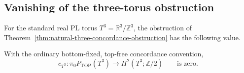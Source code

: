 \subsection{Vanishing of the three-torus obstruction}

For the standard real PL torus $T^3=\mathbb R^3/\mathbb Z^3$,
the obstruction of
Theorem~\ref{thm:natural-three-concordance-obstruction}
has the following value.

\begin{theorem}\label{thm:three-torus-concordance-obstruction}
With the ordinary bottom-fixed, top-free concordance convention,
\begin{equation}\label{eq:three-torus-obstruction-zero}
 c_{T^3}:\pi_0P_{\mathrm{TOP}}(T^3)
                   \longrightarrow H^2(T^3;\mathbb Z/2)
 \qquad\text{is zero.}
\end{equation}
\end{theorem}

